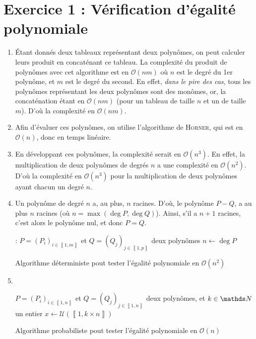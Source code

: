 \section{Exercice 1 : Vérification d'égalité polynomiale}

\begin{enumerate}
	\item Étant donnés deux tableaux représentant deux polynômes, on peut calculer leurs produit en concaténant ce tableau. La complexité du produit de polynômes avec cet algorithme est en $\mathcal{O}(nm)$\/ où $n$\/ est le degré du 1er polynôme, et $m$\/ est le degré du second. En effet, \textit{dans le pire des cas}, tous les polynômes représentant les deux polynômes sont des monômes, or, la concaténation étant en $\mathcal{O}(nm)$ (pour un tableau de taille $n$\/ et un de taille $m$). D'où la complexité en $\mathcal{O}(nm)$.
	\item Afin d'évaluer ces polynômes, on utilise l'algorithme de \textsc{Horner}, qui est en $\mathcal{O}(n)$, donc en temps linéaire.
	\item En développant ces polynômes, la complexité serait en $\mathcal{O}(n^3)$. En effet, la multiplication de deux polynômes de degrés $n$\/ a une complexité en $\mathcal{O}(n^2)$. D'où la complexité en $\mathcal{O}(n^3)$\/ pour la multiplication de deux polynômes ayant chacun un degré $n$.
	\item Un polynôme de degré $n$\/ a, au plus, $n$\/ racines. D'où, le polynôme $P - Q$, a au plus $n$\/ racines (où $n = \max(\deg P, \deg Q)$). Ainsi, s'il a $n+1$\/ racines, c'est alors le polynôme nul, et donc $P = Q$.
		\begin{algorithm}[H]
			\centering
			\begin{algorithmic}
				\/ : $P = (P_{i})_{i \in \left\llbracket 1,m \right\rrbracket }$\/ et $Q = (Q_j)_{j \in \left\llbracket 1,p \right\rrbracket }$\/ deux polynômes
				\State $n \gets \deg P$\/
					 
						\State {}\/
					\EndIf
				\EndFor
				\State {}\/
			\end{algorithmic}
			\caption{Algorithme déterministe pout tester l'égalité polynomiale en $\mathcal{O}(n^2)$}
		\end{algorithm}

	\item~
		\begin{algorithm}[H]
			\centering
			\begin{algorithmic}[1]
				\Entree $P = (P_{i})_{i \in \left\llbracket 1,n \right\rrbracket }$\/ et $Q = (Q_j)_{j \in \left\llbracket 1,n \right\rrbracket }$\/ deux polynômes, et $k \in \N$\/ un entier
				\State $x \gets \mathcal{U}(\left\llbracket 1,k\times n \right\rrbracket)$\/ \phantom{$\frac00$}
				\If{$P(x) \neq Q(x)$}
					\State\Return {\sc Non}\/
				\EndIf
				\State\Return {\sc Oui}\/
			\end{algorithmic}
			\caption{Algorithme probabiliste pout tester l'égalité polynomiale en $\mathcal{O}(n)$}
		\end{algorithm}


\end{enumerate}
